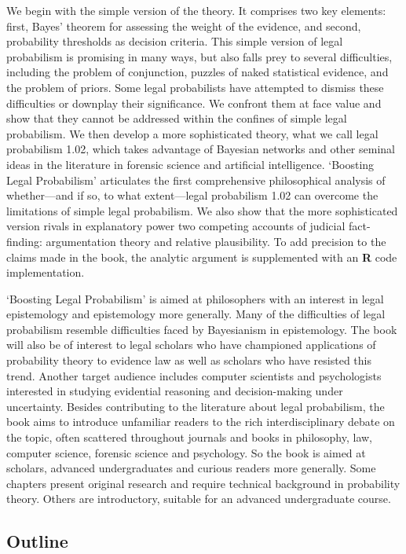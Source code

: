 \documentclass[
  10pt,
  dvipsnames,enabledeprecatedfontcommands]{scrartcl}
\begin{document}
We begin with the simple version of the theory. It comprises two key
elements: first, Bayes' theorem for assessing the weight of the
evidence, and second, probability thresholds as decision criteria. This
simple version of legal probabilism is promising in many ways, but also
falls prey to several difficulties, including the problem of
conjunction, puzzles of naked statistical evidence, and the problem of
priors. Some legal probabilists have attempted to dismiss these
difficulties or downplay their significance. We confront them at face
value and show that they cannot be addressed within the confines of
simple legal probabilism. We then develop a more sophisticated theory,
what we call legal probabilism 1.02, which takes advantage of Bayesian
networks and other seminal ideas in the literature in forensic science
and artificial intelligence. `Boosting Legal Probabilism' articulates
the first comprehensive philosophical analysis of whether---and if so,
to what extent---legal probabilism 1.02 can overcome the limitations of
simple legal probabilism. We also show that the more sophisticated
version rivals in explanatory power two competing accounts of judicial
fact-finding: argumentation theory and relative plausibility. To add
precision to the claims made in the book, the analytic argument is
supplemented with an \textbf{\textsf{R}} code implementation.

`Boosting Legal Probabilism' is aimed at philosophers with an interest
in legal epistemology and epistemology more generally. Many of the
difficulties of legal probabilism resemble difficulties faced by
Bayesianism in epistemology. The book will also be of interest to legal
scholars who have championed applications of probability theory to
evidence law as well as scholars who have resisted this trend. Another
target audience includes computer scientists and psychologists
interested in studying evidential reasoning and decision-making under
uncertainty. Besides contributing to the literature about legal
probabilism, the book aims to introduce unfamiliar readers to the rich
interdisciplinary debate on the topic, often scattered throughout
journals and books in philosophy, law, computer science, forensic
science and psychology. So the book is aimed at scholars, advanced
undergraduates and curious readers more generally. Some chapters present
original research and require technical background in probability
theory. Others are introductory, suitable for an advanced undergraduate
course.

\hypertarget{outline}{%
\subsection{Outline}\label{outline}}
\end{document}
